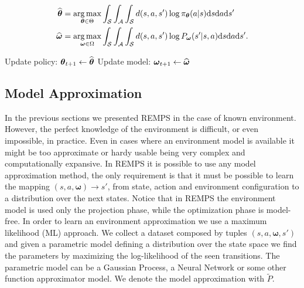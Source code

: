 \begin{algorithm}[tb]
\begin{algorithmic}[1]
\begin{description}
\begin{align}
	\widehat{\bm{\mathbf{\theta}}} & = \operatorname*{arg\,max}_{\bm{\mathbf{\theta}} \in \Theta} \int_{\mathcal{S}} \int_{\mathcal{A}}  \int_{\mathcal{S}} d(s,a,s') \log \pi_{\bm{\mathbf{\theta}}} (a|s) \mathrm{d}s \mathrm{d}a \mathrm{d}s' \\
	\widehat{\bm{\mathbf{\omega}}} & = \operatorname*{arg\,max}_{\bm{\mathbf{\omega}} \in \Omega} \int_{\mathcal{S}} \int_{\mathcal{A}}  \int_{\mathcal{S}} d(s,a,s') \log P_{\bm{\mathbf{\omega}}} (s'|s,a) \mathrm{d}s \mathrm{d}a \mathrm{d}s'.
\end{align} 
\end{description}
  \State Update policy: $\bm{\mathbf{\theta}}_{t+1} \leftarrow \widehat{\bm{\mathbf{\theta}}}$ 
  \State Update model: $\bm{\mathbf{\omega}}_{t+1} \leftarrow \widehat{\bm{\mathbf{\omega}}}$
  \EndFor \\
  \end{algorithmic}
\end{algorithm}


\subsection{Model Approximation}
In the previous sections we presented REMPS in the case of known environment. However, the perfect knowledge of the environment is difficult, or even impossible, in practice. Even in cases where an environment model is available it might be too approximate or hardy usable being very complex and computationally expansive. \newline In REMPS it is possible to use any model approximation method, the only requirement is that it must be possible to learn the mapping $(s, a , \boldsymbol{\omega}) \rightarrow s'$, from state, action and environment configuration to a distribution over the next states. Notice that in REMPS the environment model is used only the projection phase, while the optimization phase is model-free. \newline
In order to learn an environment approximation we use a maximum likelihood (ML) approach. We collect a dataset composed by tuples $(s, a,\boldsymbol{\omega}, s')$ and given a parametric model defining a distribution over the state space we find the parameters by maximizing the log-likelihood of the seen transitions. The parametric model can be a Gaussian Process, a Neural Network or some other function approximator model. We denote the model approximation with $\widetilde{P}$. \newline
